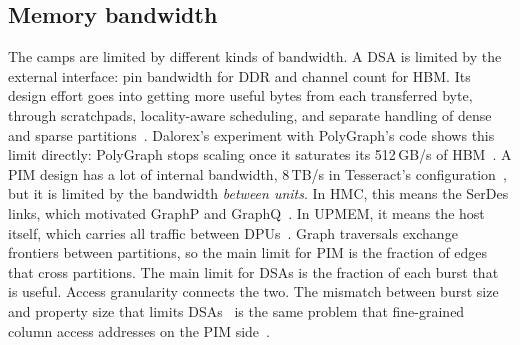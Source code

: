 \documentclass[journal,onecolumn]{IEEEtran}
\begin{document}
\subsection{Memory bandwidth}
The camps are limited by different kinds of bandwidth. A DSA is limited by the external interface: pin bandwidth for DDR and channel count for HBM. Its design effort goes into getting more useful bytes from each transferred byte, through scratchpads, locality-aware scheduling, and separate handling of dense and sparse partitions~\cite{ham2016graphicionado,mukkara2018hats,chen2022regraph}. Dalorex's experiment with PolyGraph's code shows this limit directly: PolyGraph stops scaling once it saturates its 512\,GB/s of HBM~\cite{orenesvera2023dalorex}. A PIM design has a lot of internal bandwidth, 8\,TB/s in Tesseract's configuration~\cite{ahn2015tesseract}, but it is limited by the bandwidth \emph{between units}. In HMC, this means the SerDes links, which motivated GraphP and GraphQ~\cite{zhang2018graphp,zhuo2019graphq}. In UPMEM, it means the host itself, which carries all traffic between DPUs~\cite{gomezluna2022prim}. Graph traversals exchange frontiers between partitions, so the main limit for PIM is the fraction of edges that cross partitions. The main limit for DSAs is the fraction of each burst that is useful. Access granularity connects the two. The mismatch between burst size and property size that limits DSAs~\cite{shin2025piccolo} is the same problem that fine-grained column access addresses on the PIM side~\cite{shin2025fala,yenimol2026cograf}.
\end{document}
